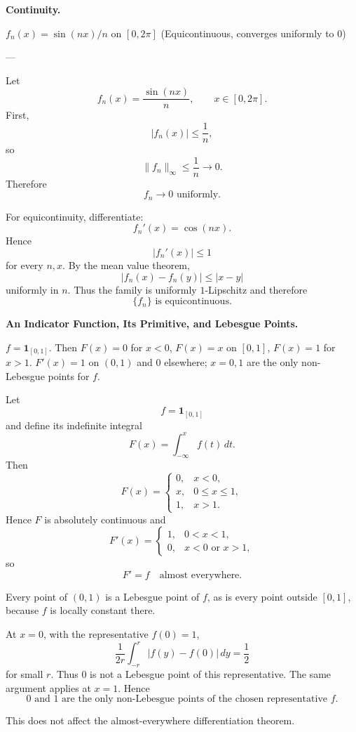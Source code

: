 \begin{problem}[CP-II-0246]
\label{prob:cp-ii-0246}
\textbf{Continuity.}

\hspace*{1.5em}$f_n(x)=\sin(nx)/n$ on $[0,2\pi]$ (Equicontinuous, converges uniformly to 0)

---
\end{problem}

\begin{solution}
Let
\[
f_n(x)=\frac{\sin(nx)}{n},
\qquad
x\in[0,2\pi].
\]
First,
\[
|f_n(x)|
\le
\frac1n,
\]
so
\[
\|f_n\|_\infty
\le
\frac1n
\longrightarrow0.
\]
Therefore
\[
\boxed{f_n\to0\text{ uniformly}.}
\]

For equicontinuity, differentiate:
\[
f_n'(x)=\cos(nx).
\]
Hence
\[
|f_n'(x)|\le1
\]
for every \(n,x\). By the mean value theorem,
\[
|f_n(x)-f_n(y)|
\le
|x-y|
\]
uniformly in \(n\). Thus the family is uniformly \(1\)-Lipschitz and therefore
\[
\boxed{\{f_n\}\text{ is equicontinuous}.}
\]
\end{solution}


\begin{problem}[CP-II-0247]
\label{prob:cp-ii-0247}
\textbf{An Indicator Function, Its Primitive, and Lebesgue Points.}

\hspace*{1.5em}$f=\mathbf 1_{[0,1]}$. Then $F(x)=0$ for $x<0$, $F(x)=x$ on $[0,1]$, $F(x)=1$ for $x>1$.
	$F'(x)=1$ on $(0,1)$ and $0$ elsewhere; $x=0,1$ are the only non-Lebesgue points for $f$.
\end{problem}

\begin{solution}
Let
\[
f=\mathbf1_{[0,1]}
\]
and define its indefinite integral
\[
F(x)
=
\int_{-\infty}^{x}f(t)\,dt.
\]
Then
\[
F(x)
=
\begin{cases}
0,&x<0,\\
x,&0\le x\le1,\\
1,&x>1.
\end{cases}
\]
Hence \(F\) is absolutely continuous and
\[
F'(x)
=
\begin{cases}
1,&0<x<1,\\
0,&x<0\text{ or }x>1,
\end{cases}
\]
so
\[
\boxed{F'=f\quad\text{almost everywhere}.}
\]

Every point of \((0,1)\) is a Lebesgue point of \(f\), as is every point outside
\([0,1]\), because \(f\) is locally constant there.

At \(x=0\), with the representative \(f(0)=1\),
\[
\frac1{2r}
\int_{-r}^{r}|f(y)-f(0)|\,dy
=
\frac12
\]
for small \(r\). Thus \(0\) is not a Lebesgue point of this representative. The same argument
applies at \(x=1\). Hence
\[
\boxed{
0\text{ and }1\text{ are the only non-Lebesgue points of the chosen representative }f.
}
\]

This does not affect the almost-everywhere differentiation theorem.
\end{solution}


